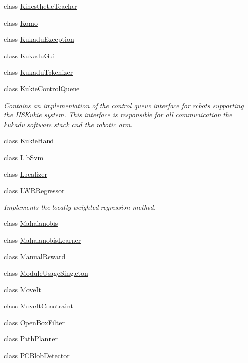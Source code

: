 \begin{DoxyCompactItemize}
class \hyperlink{classkukadu_1_1KinestheticTeacher}{Kinesthetic\+Teacher}
\item 
class \hyperlink{classkukadu_1_1Komo}{Komo}
\item 
class \hyperlink{classkukadu_1_1KukaduException}{Kukadu\+Exception}
\item 
class \hyperlink{classkukadu_1_1KukaduGui}{Kukadu\+Gui}
\item 
class \hyperlink{classkukadu_1_1KukaduTokenizer}{Kukadu\+Tokenizer}
\item 
class \hyperlink{classkukadu_1_1KukieControlQueue}{Kukie\+Control\+Queue}
\begin{DoxyCompactList}\small\item\em Contains an implementation of the control queue interface for robots supporting the I\+I\+S\+Kukie system. This interface is responsible for all communication the kukadu software stack and the robotic arm. \end{DoxyCompactList}\item 
class \hyperlink{classkukadu_1_1KukieHand}{Kukie\+Hand}
\item 
class \hyperlink{classkukadu_1_1LibSvm}{Lib\+Svm}
\item 
class \hyperlink{classkukadu_1_1Localizer}{Localizer}
\item 
class \hyperlink{classkukadu_1_1LWRRegressor}{L\+W\+R\+Regressor}
\begin{DoxyCompactList}\small\item\em Implements the locally weighted regression method. \end{DoxyCompactList}\item 
class \hyperlink{classkukadu_1_1Mahalanobis}{Mahalanobis}
\item 
class \hyperlink{classkukadu_1_1MahalanobisLearner}{Mahalanobis\+Learner}
\item 
class \hyperlink{classkukadu_1_1ManualReward}{Manual\+Reward}
\item 
class \hyperlink{classkukadu_1_1ModuleUsageSingleton}{Module\+Usage\+Singleton}
\item 
class \hyperlink{classkukadu_1_1MoveIt}{Move\+It}
\item 
class \hyperlink{classkukadu_1_1MoveItConstraint}{Move\+It\+Constraint}
\item 
class \hyperlink{classkukadu_1_1OpenBoxFilter}{Open\+Box\+Filter}
\item 
class \hyperlink{classkukadu_1_1PathPlanner}{Path\+Planner}
\item 
class \hyperlink{classkukadu_1_1PCBlobDetector}{P\+C\+Blob\+Detector}

\end{DoxyCompactItemize}
